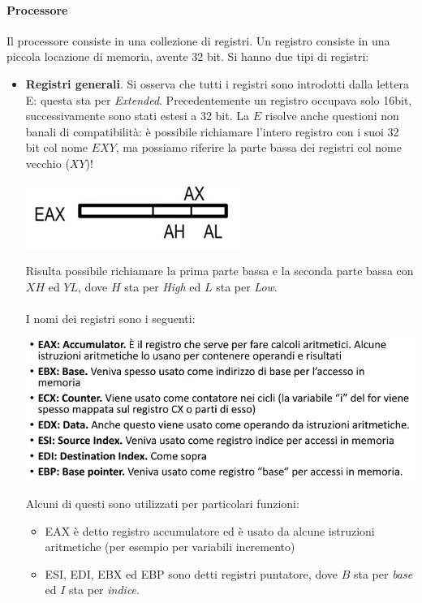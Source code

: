 \documentclass[11pt]{report}
\begin{document}
\paragraph{Processore} Il processore consiste in una collezione di registri. Un registro consiste in una piccola locazione di memoria, avente 32 bit. Si hanno due tipi di registri:
\begin{itemize}
\item \textbf{Registri generali}. Si osserva che tutti i registri sono introdotti dalla lettera E: questa sta per \emph{Extended}. Precedentemente un registro occupava solo 16bit, successivamente sono stati estesi a 32 bit. La $E$ risolve anche questioni non banali di compatibilità: è possibile richiamare l'intero registro con i suoi 32 bit col nome $EXY$, ma possiamo riferire la parte bassa dei registri col nome vecchio ($XY$)!
\begin{center}
\includegraphics{img/5.PNG}
\end{center}
Risulta possibile richiamare la prima parte bassa e la seconda parte bassa con $XH$ ed $YL$, dove $H$ sta per \emph{High} ed $L$ sta per \emph{Low}.\\\\
I nomi dei registri sono i seguenti:
\begin{center}
\includegraphics{img/6.PNG}
\end{center}
Alcuni  di questi sono utilizzati per particolari funzioni:
\begin{itemize}
\item EAX è detto registro accumulatore ed è usato da alcune istruzioni aritmetiche (per esempio per variabili incremento)
\item ESI, EDI, EBX ed EBP sono detti registri puntatore, dove $B$ sta per \emph{base} ed $I$ sta per \emph{indice}.

\end{itemize}
\end{itemize}
\end{document}
